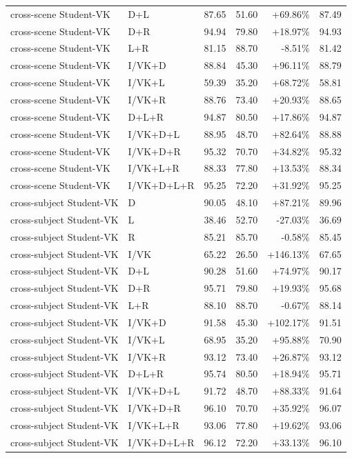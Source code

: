 \documentclass[UTF8,10pt]{ctexart}
\newcommand{\better}[1]{\textcolor{goodblue}{#1}}
\newcommand{\worse}[1]{\textcolor{badred}{#1}}
\begin{document}
{\begin{longtable}{llrrrr}
cross-scene Student-VK & D+L & 87.65 & 51.60 & \better{+69.86\%} & 87.49\\
cross-scene Student-VK & D+R & 94.94 & 79.80 & \better{+18.97\%} & 94.93\\
cross-scene Student-VK & L+R & 81.15 & 88.70 & \worse{-8.51\%} & 81.42\\
cross-scene Student-VK & I/VK+D & 88.84 & 45.30 & \better{+96.11\%} & 88.79\\
cross-scene Student-VK & I/VK+L & 59.39 & 35.20 & \better{+68.72\%} & 58.81\\
cross-scene Student-VK & I/VK+R & 88.76 & 73.40 & \better{+20.93\%} & 88.65\\
cross-scene Student-VK & D+L+R & 94.87 & 80.50 & \better{+17.86\%} & 94.87\\
cross-scene Student-VK & I/VK+D+L & 88.95 & 48.70 & \better{+82.64\%} & 88.88\\
cross-scene Student-VK & I/VK+D+R & 95.32 & 70.70 & \better{+34.82\%} & 95.32\\
cross-scene Student-VK & I/VK+L+R & 88.33 & 77.80 & \better{+13.53\%} & 88.34\\
cross-scene Student-VK & I/VK+D+L+R & 95.25 & 72.20 & \better{+31.92\%} & 95.25\\
cross-subject Student-VK & D & 90.05 & 48.10 & \better{+87.21\%} & 89.96\\
cross-subject Student-VK & L & 38.46 & 52.70 & \worse{-27.03\%} & 36.69\\
cross-subject Student-VK & R & 85.21 & 85.70 & \worse{-0.58\%} & 85.45\\
cross-subject Student-VK & I/VK & 65.22 & 26.50 & \better{+146.13\%} & 67.65\\
cross-subject Student-VK & D+L & 90.28 & 51.60 & \better{+74.97\%} & 90.17\\
cross-subject Student-VK & D+R & 95.71 & 79.80 & \better{+19.93\%} & 95.68\\
cross-subject Student-VK & L+R & 88.10 & 88.70 & \worse{-0.67\%} & 88.14\\
cross-subject Student-VK & I/VK+D & 91.58 & 45.30 & \better{+102.17\%} & 91.51\\
cross-subject Student-VK & I/VK+L & 68.95 & 35.20 & \better{+95.88\%} & 70.90\\
cross-subject Student-VK & I/VK+R & 93.12 & 73.40 & \better{+26.87\%} & 93.12\\
cross-subject Student-VK & D+L+R & 95.74 & 80.50 & \better{+18.94\%} & 95.71\\
cross-subject Student-VK & I/VK+D+L & 91.72 & 48.70 & \better{+88.33\%} & 91.64\\
cross-subject Student-VK & I/VK+D+R & 96.10 & 70.70 & \better{+35.92\%} & 96.07\\
cross-subject Student-VK & I/VK+L+R & 93.06 & 77.80 & \better{+19.62\%} & 93.06\\
cross-subject Student-VK & I/VK+D+L+R & 96.12 & 72.20 & \better{+33.13\%} & 96.10\\
\bottomrule
\end{longtable}
}
\end{document}
